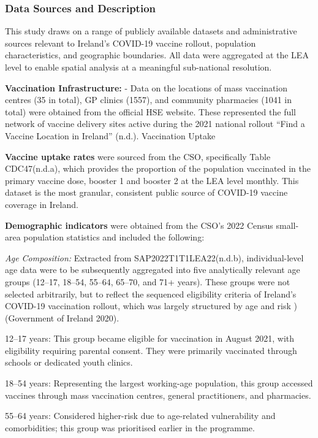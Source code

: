 \documentclass{article}
\begin{document}
\subsubsection{Data Sources and
Description}\label{data-sources-and-description}

This study draws on a range of publicly available datasets and
administrative sources relevant to Ireland's COVID-19 vaccine rollout,
population characteristics, and geographic boundaries. All data were
aggregated at the LEA level to enable spatial analysis at a meaningful
sub-national resolution.

\textbf{Vaccination Infrastructure:} - Data on the locations of mass
vaccination centres (35 in total), GP clinics (1557), and community
pharmacies (1041 in total) were obtained from the official HSE website.
These represented the full network of vaccine delivery sites active
during the 2021 national rollout {``Find a Vaccine Location in
{Ireland}''} (n.d.). Vaccination Uptake

\textbf{Vaccine uptake rates} were sourced from the CSO, specifically
Table CDC47(n.d.a), which provides the proportion of the population
vaccinated in the primary vaccine dose, booster 1 and booster 2 at the
LEA level monthly. This dataset is the most granular, consistent public
source of COVID-19 vaccine coverage in Ireland.

\textbf{Demographic indicators} were obtained from the CSO's 2022 Census
small-area population statistics and included the following:

\emph{Age Composition:} Extracted from SAP2022T1T1LEA22(n.d.b),
individual-level age data were to be subsequently aggregated into five
analytically relevant age groups (12--17, 18--54, 55--64, 65--70, and
71+ years). These groups were not selected arbitrarily, but to reflect
the sequenced eligibility criteria of Ireland's COVID-19 vaccination
rollout, which was largely structured by age and risk )(Government of
Ireland 2020).

12--17 years: This group became eligible for vaccination in August 2021,
with eligibility requiring parental consent. They were primarily
vaccinated through schools or dedicated youth clinics.

18--54 years: Representing the largest working-age population, this
group accessed vaccines through mass vaccination centres, general
practitioners, and pharmacies.

55--64 years: Considered higher-risk due to age-related vulnerability
and comorbidities; this group was prioritised earlier in the programme.
\end{document}
